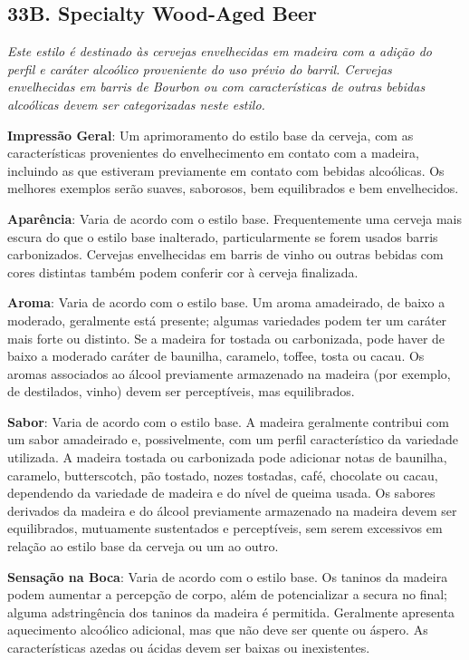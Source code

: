 \subsection*{33B. Specialty Wood-Aged Beer}

\textit{Este estilo é destinado às cervejas envelhecidas em madeira com a adição do perfil e caráter alcoólico proveniente do uso prévio do barril. Cervejas envelhecidas em barris de Bourbon ou com características de outras bebidas alcoólicas devem ser categorizadas neste estilo.}

\textbf{Impressão Geral}: Um aprimoramento do estilo base da cerveja, com as características provenientes do envelhecimento em contato com a madeira, incluindo as que estiveram previamente em contato com bebidas alcoólicas. Os melhores exemplos serão suaves, saborosos, bem equilibrados e bem envelhecidos.

\textbf{Aparência}: Varia de acordo com o estilo base. Frequentemente uma cerveja mais escura do que o estilo base inalterado, particularmente se forem usados barris carbonizados. Cervejas envelhecidas em barris de vinho ou outras bebidas com cores distintas também podem conferir cor à cerveja finalizada.

\textbf{Aroma}: Varia de acordo com o estilo base. Um aroma amadeirado, de baixo a moderado, geralmente está presente; algumas variedades podem ter um caráter mais forte ou distinto. Se a madeira for tostada ou carbonizada, pode haver de baixo a moderado caráter de baunilha, caramelo, toffee, tosta ou cacau. Os aromas associados ao álcool previamente armazenado na madeira (por exemplo, de destilados, vinho) devem ser perceptíveis, mas equilibrados.

\textbf{Sabor}: Varia de acordo com o estilo base. A madeira geralmente contribui com um sabor amadeirado e, possivelmente, com um perfil característico da variedade utilizada. A madeira tostada ou carbonizada pode adicionar notas de baunilha, caramelo, butterscotch, pão tostado, nozes tostadas, café, chocolate ou cacau, dependendo da variedade de madeira e do nível de queima usada. Os sabores derivados da madeira e do álcool previamente armazenado na madeira devem ser equilibrados, mutuamente sustentados e perceptíveis, sem serem excessivos em relação ao estilo base da cerveja ou um ao outro.

\textbf{Sensação na Boca}: Varia de acordo com o estilo base. Os taninos da madeira podem aumentar a percepção de corpo, além de potencializar a secura no final; alguma adstringência dos taninos da madeira é permitida. Geralmente apresenta aquecimento alcoólico adicional, mas que não deve ser quente ou áspero. As características azedas ou ácidas devem ser baixas ou inexistentes.

